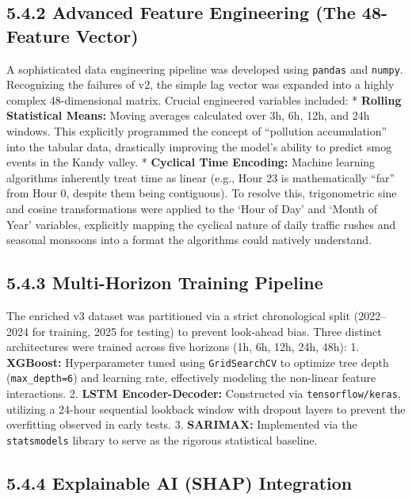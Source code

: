 \subsection{5.4.2 Advanced Feature Engineering (The 48-Feature
Vector)}\label{advanced-feature-engineering-the-48-feature-vector}

A sophisticated data engineering pipeline was developed using
\texttt{pandas} and \texttt{numpy}. Recognizing the failures of v2, the
simple lag vector was expanded into a highly complex 48-dimensional
matrix. Crucial engineered variables included: * \textbf{Rolling
Statistical Means:} Moving averages calculated over 3h, 6h, 12h, and 24h
windows. This explicitly programmed the concept of ``pollution
accumulation'' into the tabular data, drastically improving the model's
ability to predict smog events in the Kandy valley. * \textbf{Cyclical
Time Encoding:} Machine learning algorithms inherently treat time as
linear (e.g., Hour 23 is mathematically ``far'' from Hour 0, despite
them being contiguous). To resolve this, trigonometric sine and cosine
transformations were applied to the `Hour of Day' and `Month of Year'
variables, explicitly mapping the cyclical nature of daily traffic
rushes and seasonal monsoons into a format the algorithms could natively
understand.

\subsection{5.4.3 Multi-Horizon Training
Pipeline}\label{multi-horizon-training-pipeline}

The enriched v3 dataset was partitioned via a strict chronological split
(2022--2024 for training, 2025 for testing) to prevent look-ahead bias.
Three distinct architectures were trained across five horizons (1h, 6h,
12h, 24h, 48h): 1. \textbf{XGBoost:} Hyperparameter tuned using
\texttt{GridSearchCV} to optimize tree depth (\texttt{max\_depth=6}) and
learning rate, effectively modeling the non-linear feature interactions.
2. \textbf{LSTM Encoder-Decoder:} Constructed via
\texttt{tensorflow/keras}, utilizing a 24-hour sequential lookback
window with dropout layers to prevent the overfitting observed in early
tests. 3. \textbf{SARIMAX:} Implemented via the \texttt{statsmodels}
library to serve as the rigorous statistical baseline.

\subsection{5.4.4 Explainable AI (SHAP)
Integration}\label{explainable-ai-shap-integration}

